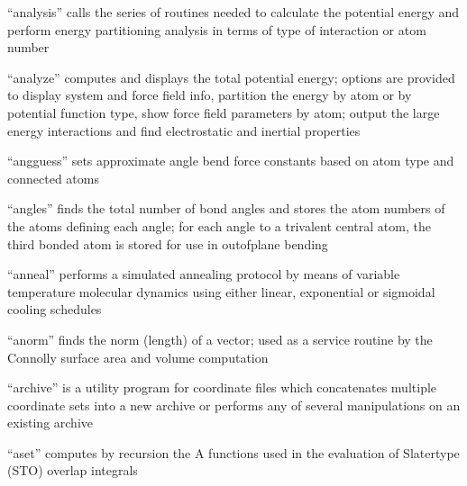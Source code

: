 \documentclass[letterpaper,11pt,english]{sphinxmanual}
\begin{document}
“analysis” calls the series of routines needed to calculate
the potential energy and perform energy partitioning analysis
in terms of type of interaction or atom number


“analyze” computes and displays the total potential energy;
options are provided to display system and force field info,
partition the energy by atom or by potential function type,
show force field parameters by atom; output the large energy
interactions and find electrostatic and inertial properties


“angguess” sets approximate angle bend force constants based
on atom type and connected atoms


“angles” finds the total number of bond angles and stores
the atom numbers of the atoms defining each angle; for
each angle to a trivalent central atom, the third bonded
atom is stored for use in out\sphinxhyphen{}of\sphinxhyphen{}plane bending


“anneal” performs a simulated annealing protocol by means of
variable temperature molecular dynamics using either linear,
exponential or sigmoidal cooling schedules


“anorm” finds the norm (length) of a vector; used as a
service routine by the Connolly surface area and volume
computation







“archive” is a utility program for coordinate files which
concatenates multiple coordinate sets into a new archive or
performs any of several manipulations on an existing archive


“aset” computes by recursion the A functions used in the
evaluation of Slater\sphinxhyphen{}type (STO) overlap integrals
\end{document}
